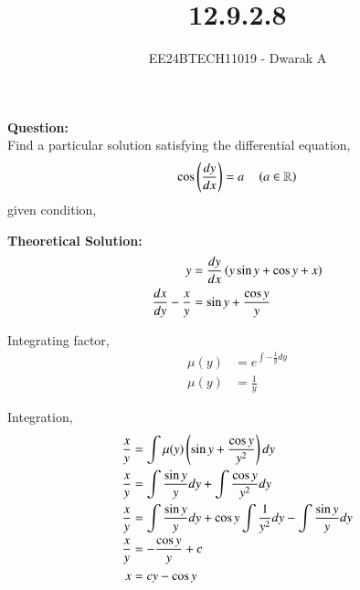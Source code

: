\documentclass[journal]{IEEEtran}
\begin{document}

\vspace{3cm}

\title{12.9.2.8}
\author{EE24BTECH11019 - Dwarak A}
{\let\newpage\relax\maketitle}

\renewcommand{\thefigure}{\theenumi}
\renewcommand{\thetable}{\theenumi}
\setlength{\intextsep}{10pt} %


\renewcommand{\thetable}{\theenumi}

\textbf{Question:}\\
Find a particular solution satisfying the differential equation,
\begin{align}
    \cos{\ensuremath{\left(\frac{dy}{dx}\right)}} = a \quad \left(a\in\mathbb{R}\right)
\end{align}
given condition,

\solution

\medskip

\textbf{Theoretical Solution:}
\begin{align}
    y &= \frac{dy}{dx}\left(y\sin{y}+\cos{y}+x\right) \\
    \frac{dx}{dy} - \frac{x}{y} &= \sin{y} + \frac{\cos{y}}{y}
\end{align}

Integrating factor,
\begin{align}
    \mu(y) &= e^{\int-\frac{1}{y}dy} \\
    \mu(y) &= \frac{1}{y}
\end{align}

Integration,
\begin{align}
    \frac{x}{y} &= \int\mu(y)\left(\sin{y}+\frac{\cos{y}}{y^2}\right)dy \\
    \frac{x}{y} &= \int\frac{\sin{y}}{y}dy+\int\frac{\cos{y}}{y^2}dy \\
    \frac{x}{y} &= \int\frac{\sin{y}}{y}dy+\cos{y}\int\frac{1}{y^2}dy-\int\frac{\sin{y}}{y}dy \\
    \frac{x}{y} &= -\frac{\cos{y}}{y}+c \\
    x &= cy-\cos{y}
    \label{eqn:gen_soln}
\end{align}
\end{document}
